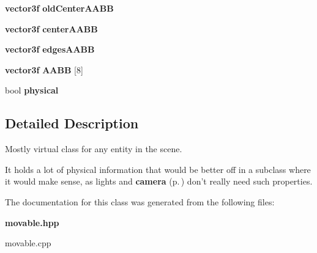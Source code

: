 \begin{CompactItemize}
\item 
{}
{\bf vector3f} {\bf old\-Center\-AABB}\label{classmovable_m23}

\item 
{}
{\bf vector3f} {\bf center\-AABB}\label{classmovable_m24}

\item 
{}
{\bf vector3f} {\bf edges\-AABB}\label{classmovable_m25}

\item 
{}
{\bf vector3f} {\bf AABB} [8]\label{classmovable_m26}

\item 
{}
bool {\bf physical}\label{classmovable_m27}

\end{CompactItemize}


\subsection{Detailed Description}
Mostly virtual class for any entity in the scene.

It holds a lot of physical information that would be better off in a subclass where it would make sense, as lights and {\bf camera} {\rm (p.\,\pageref{classcamera})} don't really need such properties. 



The documentation for this class was generated from the following files:\begin{CompactItemize}
\item 
{\bf movable.hpp}\item 
movable.cpp\end{CompactItemize}
